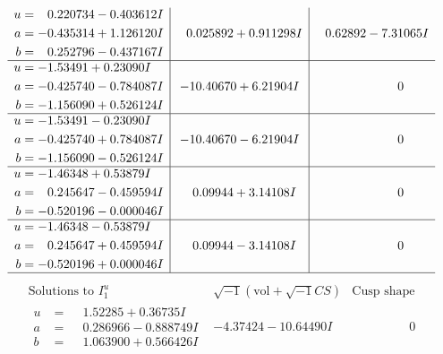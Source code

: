 \documentclass[1p]{elsarticle_modified}
\theoremstyle{definition}
\newcommand{\I}{\sqrt{-1}}
\begin{document}
$$\begin{array}{c|c|c}
\begin{aligned}
u &= \phantom{-}0.220734 - 0.403612 I \\
a &= -0.435314 + 1.126120 I \\
b &= \phantom{-}0.252796 - 0.437167 I\end{aligned}
 & \phantom{-}0.025892 + 0.911298 I & \phantom{-}0.62892 - 7.31065 I \\ \hline\begin{aligned}
u &= -1.53491 + 0.23090 I \\
a &= -0.425740 - 0.784087 I \\
b &= -1.156090 + 0.526124 I\end{aligned}
 & -10.40670 + 6.21904 I & \phantom{-0.000000 } 0 \\ \hline\begin{aligned}
u &= -1.53491 - 0.23090 I \\
a &= -0.425740 + 0.784087 I \\
b &= -1.156090 - 0.526124 I\end{aligned}
 & -10.40670 - 6.21904 I & \phantom{-0.000000 } 0 \\ \hline\begin{aligned}
u &= -1.46348 + 0.53879 I \\
a &= \phantom{-}0.245647 - 0.459594 I \\
b &= -0.520196 - 0.000046 I\end{aligned}
 & \phantom{-}0.09944 + 3.14108 I & \phantom{-0.000000 } 0 \\ \hline\begin{aligned}
u &= -1.46348 - 0.53879 I \\
a &= \phantom{-}0.245647 + 0.459594 I \\
b &= -0.520196 + 0.000046 I\end{aligned}
 & \phantom{-}0.09944 - 3.14108 I & \phantom{-0.000000 } 0\\
 \hline 
 \end{array}$$\newpage$$\begin{array}{c|c|c}  
\text{Solutions to }I^u_{1}& \I (\text{vol} + \sqrt{-1}CS) & \text{Cusp shape}\\
 \hline 
\begin{aligned}
u &= \phantom{-}1.52285 + 0.36735 I \\
a &= \phantom{-}0.286966 - 0.888749 I \\
b &= \phantom{-}1.063900 + 0.566426 I\end{aligned}
 & -4.37424 - 10.64490 I & \phantom{-0.000000 } 0 \\ \hline\begin{aligned}

\end{aligned}
\end{array}$$
\end{document}
